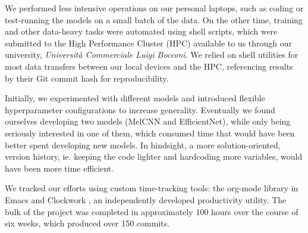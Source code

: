 \documentclass[10pt]{article}
\begin{document}
We performed less intensive operations on our personal laptops, such as coding or test-running the models on a small batch of the data. On the other time, training and other data-heavy tasks were automated using shell scripts, which were submitted to the High Performance Cluster (HPC) available to us through our university, \textit{Università Commerciale Luigi Bocconi}\cite{unibocconi}. We relied on shell utilities for most data transfers between our local devices and the HPC, referencing results by their Git commit hash for reproducibility.

Initially, we experimented with different models and introduced flexible hyperparameter configurations to increase generality. Eventually we found ourselves developing two models (MelCNN and EfficientNet), while only being seriously interested in one of them, which consumed time that would have been better spent developing new models. In hindsight, a more solution-oriented, version history, ie. keeping the code lighter and hardcoding more variables, would have been more time efficient.

We tracked our efforts using custom time-tracking tools: the org-mode library \cite{doom_emacs} in Emacs \cite{gnu_emacs} and Clockwork \cite{clockwork}, an independently developed productivity utility. The bulk of the project was completed in approximately 100 hours over the course of six weeks, which produced over 150 commits.
\end{document}
